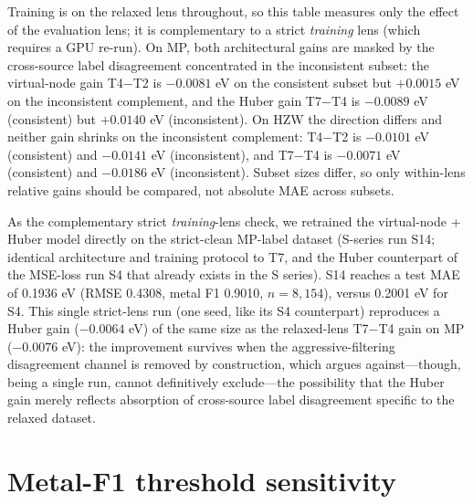 \documentclass[a4paper,10pt]{article}
\begin{document}
Training is on the relaxed lens throughout, so this table measures only the effect of the evaluation lens; it is complementary to a strict \emph{training} lens (which requires a GPU re-run). On MP, both architectural gains are masked by the cross-source label disagreement concentrated in the inconsistent subset: the virtual-node gain T4\(-\)T2 is \(-0.0081\) eV on the consistent subset but \(+0.0015\) eV on the inconsistent complement, and the Huber gain T7\(-\)T4 is \(-0.0089\) eV (consistent) but \(+0.0140\) eV (inconsistent). On HZW the direction differs and neither gain shrinks on the inconsistent complement: T4\(-\)T2 is \(-0.0101\) eV (consistent) and \(-0.0141\) eV (inconsistent), and T7\(-\)T4 is \(-0.0071\) eV (consistent) and \(-0.0186\) eV (inconsistent). Subset sizes differ, so only within-lens relative gains should be compared, not absolute MAE across subsets.

As the complementary strict \emph{training}-lens check, we retrained the virtual-node + Huber model directly on the strict-clean MP-label dataset (S-series run S14; identical architecture and training protocol to T7, and the Huber counterpart of the MSE-loss run S4 that already exists in the S series). S14 reaches a test MAE of 0.1936 eV (RMSE 0.4308, metal F1 0.9010, \(n=8{,}154\)), versus 0.2001 eV for S4. This single strict-lens run (one seed, like its S4 counterpart) reproduces a Huber gain (\(-0.0064\) eV) of the same size as the relaxed-lens T7\(-\)T4 gain on MP (\(-0.0076\) eV): the improvement survives when the aggressive-filtering disagreement channel is removed by construction, which argues against---though, being a single run, cannot definitively exclude---the possibility that the Huber gain merely reflects absorption of cross-source label disagreement specific to the relaxed dataset.

\section{Metal-F1 threshold sensitivity}
\end{document}

